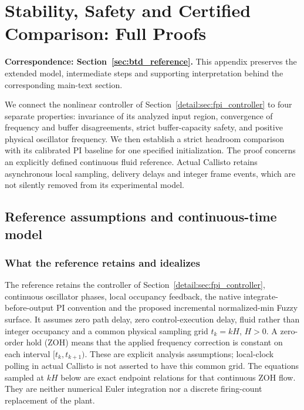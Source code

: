 \section{Stability, Safety and Certified Comparison: Full Proofs}
\label{app:theory}
\noindent\textbf{Correspondence: Section~\ref{sec:btd_reference}.} This appendix preserves the extended model, intermediate steps and supporting interpretation behind the corresponding main-text section.


\label{detail:sec:btd_reference}

We connect the nonlinear controller of Section~\ref{detail:sec:fpi_controller}
to four separate properties: invariance of its analyzed input region,
convergence of frequency and buffer disagreements, strict buffer-capacity
safety, and positive physical oscillator frequency. We then establish a
strict headroom comparison with its calibrated PI baseline for one
specified initialization. The proof concerns an explicitly defined
continuous fluid reference. Actual Callisto retains asynchronous local
sampling, delivery delays and integer frame events, which are not
silently removed from its experimental model.

\subsection{Reference assumptions and continuous-time model}
\label{detail:subsec:btd_ref_model}

\subsubsection{What the reference retains and idealizes}
The reference retains the controller of Section~\ref{detail:sec:fpi_controller}, continuous oscillator phases, local occupancy
feedback, the native integrate-before-output PI convention and the proposed
incremental normalized-min Fuzzy surface. It assumes zero path delay,
zero control-execution delay, fluid rather than integer occupancy and a
common physical sampling grid $t_k=kH$, $H>0$. A zero-order hold (ZOH)
means that the applied frequency correction is constant on each interval
$[t_k,t_{k+1})$. These are explicit analysis assumptions; local-clock
polling in actual Callisto is not asserted to have this common grid.
The equations sampled at $kH$ below are exact endpoint relations for that
continuous ZOH flow. They are neither numerical Euler integration nor a
discrete firing-count replacement of the plant.

